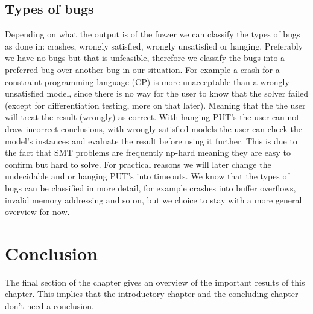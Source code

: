 \subsection{Types of bugs} 
Depending on what the output is of the fuzzer we can classify the types of bugs as done in\cite{1mansur2020detecting}: crashes, wrongly satisfied, wrongly unsatisfied or hanging. Preferably we have no bugs but that is unfeasible, therefore we classify the bugs into a preferred bug over another bug in our situation. For example a crash for a constraint programming language (CP) is more unacceptable than a wrongly unsatisfied model, since there is no way for the user to know that the solver failed (except for differentiation testing, more on that later). Meaning that the the user will treat the result (wrongly) as correct. With hanging PUT's the user can not draw incorrect conclusions, with wrongly satisfied models the user can check the model's instances and evaluate the result before using it further. This is due to the fact that SMT problems are frequently np-hard meaning they are easy to confirm but hard to solve. For practical reasons we will later change the undecidable and or hanging PUT's into timeouts. We know that the types of bugs can be classified in more detail, for example crashes into buffer overflows, invalid memory addressing and so on, but we choice to stay with a more general overview for now.

\section{Conclusion}
The final section of the chapter gives an overview of the important results
of this chapter. This implies that the introductory chapter and the
concluding chapter don't need a conclusion.


